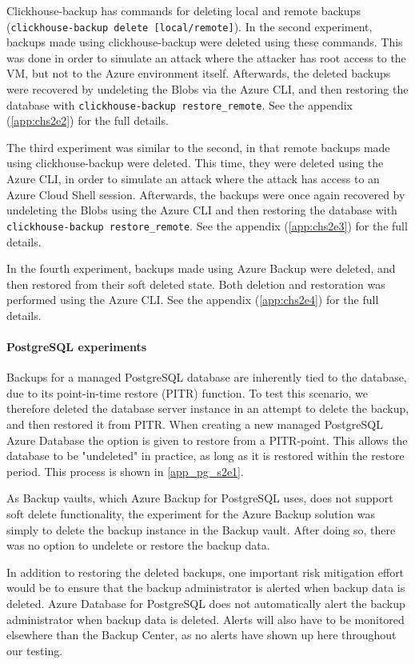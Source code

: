 Clickhouse-backup has commands for deleting local and remote backups 
(\texttt{clickhouse-backup delete [local/remote]}).
In the second experiment, backups made using clickhouse-backup were deleted using these commands.
This was done in order to simulate an attack where the attacker has root access to the VM,
but not to the Azure environment itself.
Afterwards, the deleted backups were recovered by
undeleting the Blobs via the Azure CLI,
and then restoring the database with \texttt{clickhouse-backup restore\_remote}.
See the appendix (\ref{app:chs2e2}) for the full details.

The third experiment was similar to the second, 
in that remote backups made using clickhouse-backup were deleted.
This time, they were deleted  using the Azure CLI,
in order to simulate an attack where  the attack has access to an Azure Cloud Shell session.
Afterwards, the backups were once again recovered by undeleting
the Blobs using the Azure CLI and then restoring the database with \texttt{clickhouse-backup restore\_remote}.
See the appendix (\ref{app:chs2e3}) for the full details.

In the fourth experiment, backups made using Azure Backup were
deleted, and then restored from their soft deleted state.
Both deletion and restoration was performed using the Azure CLI.
See the appendix (\ref{app:chs2e4}) for the full details.


\paragraph{PostgreSQL experiments}
Backups for a managed PostgreSQL database are inherently tied to the database, due to its point-in-time restore (PITR) function. To test this scenario, we therefore deleted the database server instance in an attempt to delete the backup, and then restored it from PITR. When creating a new managed PostgreSQL Azure Database the option is given to restore from a PITR-point. This allows the database to be "undeleted" in practice, as long as it is restored within the restore period. This process is shown in \ref{app_pg_s2e1}.

As Backup vaults, which Azure Backup for PostgreSQL uses, does not support soft delete functionality, the experiment for the Azure Backup solution was simply to delete the backup instance in the Backup vault. %
After doing so, there was no option to undelete or restore the backup data. 

In addition to restoring the deleted backups, one important risk mitigation effort would be to ensure that the backup administrator is alerted when backup data is deleted. 
Azure Database for PostgreSQL does not automatically alert the backup administrator when backup data is deleted.
Alerts will also have to be monitored elsewhere than the Backup Center, as no alerts have shown up here throughout our testing.

